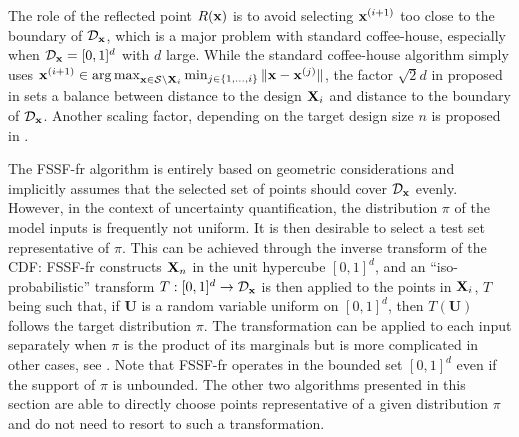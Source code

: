 The role of the reflected point $R({\bf x})$ is to avoid selecting ${\bf x}^{(i+1)}$ too close to the boundary of $\mathcal{D}_{\bf x}$, which is a major problem with standard coffee-house, especially when $\mathcal{D}_{\bf x}=[0,1]^d$ with $d$ large. 
While the standard coffee-house algorithm simply uses ${\bf x}^{(i+1)} \in \operatorname*{arg\,max}_{{\bf x} \in \mathcal{S} \setminus {\bf X}_i} \min_{j \in \{1,\ldots,i\}} \|{\bf x}-{\bf x}^{(j)}\|$, 
the factor $\sqrt{2}d$ in  proposed in \citet{shang_apley_2020} sets a balance between distance to the design ${\bf X}_i$ and distance to the boundary of $\mathcal{D}_{\bf x}$. 
Another scaling factor, depending on the target design size $n$ is proposed in \citet{NogalesPR2021}.
 
The FSSF-fr algorithm is entirely based on geometric considerations and implicitly assumes that the selected set of points should cover $\mathcal{D}_{\bf x}$ evenly. 
However, in the context of uncertainty quantification, the distribution $\pi$ of the model inputs is frequently not uniform. 
It is then desirable to select a test set representative of $\pi$. 
This can be achieved through the inverse transform of the CDF: FSSF-fr constructs ${\bf X}_n$ in the unit hypercube $[0,1]^d$, and an ``iso-probabilistic'' transform $T:[0,1]^d \rightarrow \mathcal{D}_{\bf x}$ is then applied to the points in ${\bf X}_i$, $T$ being such that, if $\boldsymbol{U}$ is a random variable uniform on $[0,1]^d$, then $T(\boldsymbol{U})$ follows the target distribution $\pi$. 
The transformation can be applied to each input separately when $\pi$ is the product of its marginals but is more complicated in other cases, see \citep[Chap.~4]{lemaire_2009}. 
Note that FSSF-fr operates in the bounded set $[0,1]^d$ even if the support of $\pi$ is unbounded. 
The other two algorithms presented in this section are able to directly choose points representative of a given distribution $\pi$ and do not need to resort to such a transformation.

